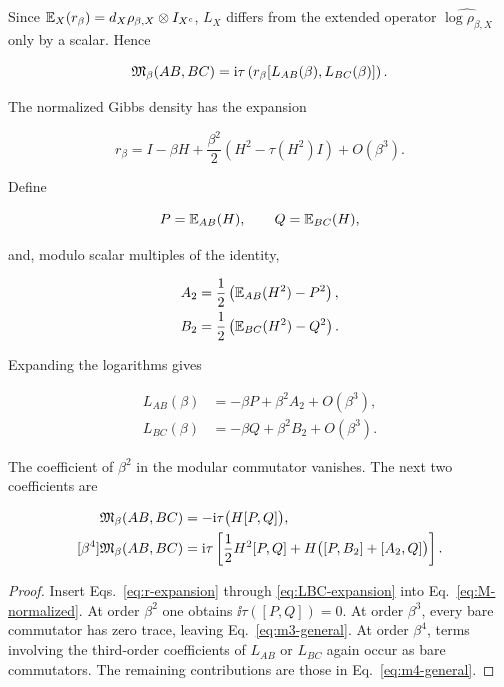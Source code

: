 Since
$\mathbb{E}_X(r_\beta)=d_X\rho_{\beta,X}\otimes I_{X^c}$,
$L_X$ differs from the extended operator
$\widehat{\log\rho_{\beta,X}}$ only by a scalar.  Hence

\begin{equation}
 \mathfrak{M}_\beta(AB,BC)
 =\mathrm{i}\tau\left(r_\beta
 [L_{AB}(\beta),L_{BC}(\beta)]\right).
 \label{eq:M-normalized}
\end{equation}

The normalized Gibbs density has the expansion

\begin{equation}
 r_\beta
 =I-\beta H
 +\frac{\beta^2}{2}
 \left(H^2-\tau(H^2)I\right)
 +O(\beta^3).
 \label{eq:r-expansion}
\end{equation}

Define

\begin{equation}
 P=\mathbb{E}_{AB}(H),
 \qquad
 Q=\mathbb{E}_{BC}(H),
 \label{eq:PQ}
\end{equation}

and, modulo scalar multiples of the identity,

\begin{align}
 A_2&=\frac12\left(\mathbb{E}_{AB}(H^2)-P^2\right),
 \label{eq:A2}\\
 B_2&=\frac12\left(\mathbb{E}_{BC}(H^2)-Q^2\right).
 \label{eq:B2}
\end{align}

Expanding the logarithms gives

\begin{align}
 L_{AB}(\beta)&=-\beta P+\beta^2A_2+O(\beta^3),
 \label{eq:LAB-expansion}\\
 L_{BC}(\beta)&=-\beta Q+\beta^2B_2+O(\beta^3).
 \label{eq:LBC-expansion}
\end{align}

\begin{lemma}
\label{lem:fourth-order-expansion}
The coefficient of $\beta^2$ in the modular commutator vanishes.  The next
two coefficients are

\begin{align}
 [\beta^3]\Mmod_\beta(AB,BC)
 &=-\ii\tau\bigl(H[P,Q]\bigr),
 \label{eq:m3-general}\\
 [\beta^4]\Mmod_\beta(AB,BC)
 &=\ii\tau\left[
 \frac12H^2[P,Q]
 +H\bigl([P,B_2]+[A_2,Q]\bigr)
 \right].
 \label{eq:m4-general}
\end{align}
\end{lemma}

\begin{proof}
Insert Eqs.~\eqref{eq:r-expansion} through
\eqref{eq:LBC-expansion} into Eq.~\eqref{eq:M-normalized}.  At order
$\beta^2$ one obtains $\ii\tau([P,Q])=0$.  At order $\beta^3$, every bare
commutator has zero trace, leaving Eq.~\eqref{eq:m3-general}.  At order
$\beta^4$, terms involving the third-order coefficients of $L_{AB}$ or
$L_{BC}$ again occur as bare commutators.  The remaining contributions are
those in Eq.~\eqref{eq:m4-general}.
\end{proof}

